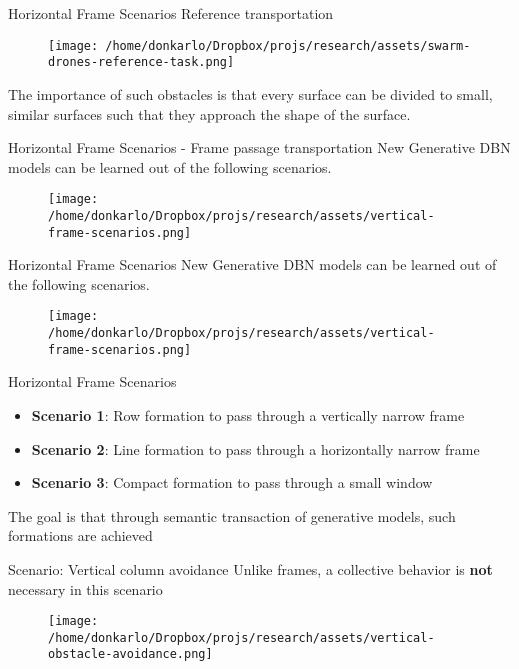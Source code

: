 \documentclass[unknownkeysallowed]{beamer}
\begin{document}
	\begin{frame}{Horizontal Frame Scenarios}
		Reference transportation
		\begin{figure}
			\centering
			\texttt{[image: /home/donkarlo/Dropbox/projs/research/assets/swarm-drones-reference-task.png]}
			\label{fig:swarm-drones-reference-task}
		\end{figure}
		The importance of such obstacles is that every surface can be divided to small, similar surfaces such that they approach the shape of the surface. 
	\end{frame}

	\begin{frame}{Horizontal Frame Scenarios - Frame passage transportation}
		New Generative DBN models can be learned out of the following scenarios. 
		\begin{figure}
			\centering
			\texttt{[image: /home/donkarlo/Dropbox/projs/research/assets/vertical-frame-scenarios.png]}
			\label{fig:collective-behaviour-learning}
		\end{figure}
	\end{frame}

	\begin{frame}{Horizontal Frame Scenarios}
		New Generative DBN models can be learned out of the following scenarios. 
		\begin{figure}
			\centering
			\texttt{[image: /home/donkarlo/Dropbox/projs/research/assets/vertical-frame-scenarios.png]}
			\label{fig:collective-behaviour-learning}
		\end{figure}
	\end{frame}

	\begin{frame}{Horizontal Frame Scenarios}
		\begin{itemize}
			\item \textbf{Scenario 1}: Row formation to pass through a vertically narrow frame 
			\item \textbf{Scenario 2}: Line formation to pass through a horizontally narrow frame
			\item \textbf{Scenario 3}: Compact formation to pass through a small window
		\end{itemize}
		The goal is that through semantic transaction of generative models, such formations are achieved
	\end{frame}

	\begin{frame}{Scenario: Vertical column avoidance}
		Unlike frames, a collective behavior is \textbf{not} necessary in this scenario
		\begin{figure}
			\centering
			\texttt{[image: /home/donkarlo/Dropbox/projs/research/assets/vertical-obstacle-avoidance.png]}
			\label{fig:vertical-obstacle-avoidance}
		\end{figure}
	\end{frame}
\end{document}
